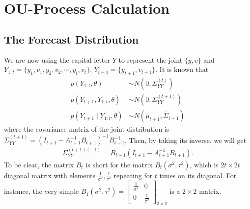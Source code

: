 \section{OU-Process Calculation}\label{OUcalculation}

\subsection*{The Forecast Distribution}
We are now using the capital letter $Y$ to represent the joint $\{y,v\}$ and $Y_{1:t} = \{y_1,v_1,y_2,v_2,\cdots, y_t, v_t \}$, $Y_{t+1} = \{y_{t+1}, v_{t+1}\}$. It is known that 
\begin{align*}
p\left(Y_{1:t},\theta\right) &\sim N\left( 0,\Sigma_{YY}^{\left(t\right)} \right)\\
p\left(Y_{t+1},Y_{1:t},\theta\right) &\sim N\left( 0,\Sigma_{YY}^{\left(t+1\right)} \right)\\
p\left(Y_{t+1}\mid Y_{1:t},\theta\right) &\sim N\left( \bar{\mu}_{t+1},\bar{\Sigma}_{t+1} \right)
\end{align*}
where the covariance matrix of the joint distribution is $\Sigma_{YY}^{\left(t+1\right)} = \left(I_{t+1}-A_{t+1}^{-1}B_{t+1}\right)^{-1}B_{t+1}^{-1}$. Then, by taking its inverse, we will get
\begin{align*}
\Sigma_{YY}^{\left(t+1\right) \left(-1\right)} = B_{t+1}\left(I_{t+1}-A_{t+1}^{-1}B_{t+1}\right).
\end{align*}
To be clear, the matrix $B_t$ is short for the matrix $B_t\left(\sigma^2,\tau^2\right)$, which is $2t\times 2t$ diagonal matrix with elements $\frac{1}{\sigma^2},\frac{1}{\tau^2}$ repeating for $t$ times on its diagonal. For instance, the very simple $B_1\left(\sigma^2,\tau^2\right) = 
\begin{bmatrix}
\frac{1}{\sigma^2} & 0  \\
0 & \frac{1}{\tau^2}
\end{bmatrix}_{2\times 2}$ is a $2\times 2$ matrix. 

